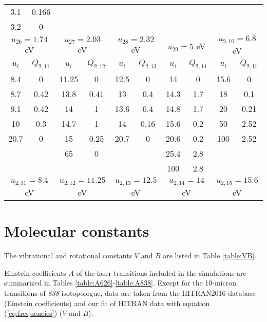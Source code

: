 \documentclass{report}
\begin{document}
\begin{appendices}
\begin{table}
\begin{tabular}{|c|c||c|c||c|c||c|c||c|c|}
3.1  & 0.166  &       &       &       &       &      &      &      &       \\
3.2  & 0      &       &       &       &       &      &      &      &       \\
\multicolumn{2}{|c||}{$u_{26}=1.74$ eV} &
\multicolumn{2}{c||}{$u_{27}=2.03$ eV} &
\multicolumn{2}{c||}{$u_{28}=2.32$ eV} &
\multicolumn{2}{c||}{$u_{29}=5$ eV} &
\multicolumn{2}{c|}{$u_{2,10}=6.8$ eV}\\
\hline
\hline 
$u_i$ & $Q_{2,11}$ & $u_i$ & $Q_{2,12}$ & $u_i$ & $Q_{2,13}$ & $u_i$ & $Q_{2,14}$ & $u_i$ & $Q_{2,15}$ \\                                                                             
\hline
8.4  & 0      & 11.25 & 0     & 12.5  & 0     & 14   & 0    & 15.6 & 0     \\
8.7  & 0.42   & 13.8  & 0.41  & 13    & 0.4   & 14.3 & 1.7  & 18   & 0.1   \\
9.1  & 0.42   & 14    & 1     & 13.6  & 0.4   & 14.8 & 1.7  & 20   & 0.21  \\
10   & 0.3    & 14.7  & 1     & 14    & 0.16  & 15.6 & 0.2  & 50   & 2.52  \\
20.7 & 0      & 15    & 0.25  & 20.7  & 0     & 20.6 & 0.2  & 100  & 2.52  \\
     &        & 65    & 0     &       &       & 25.4 & 2.8  &      &       \\
     &        &       &       &       &       & 100  & 2.8  &      &       \\
\multicolumn{2}{|c||}{$u_{2,11}=8.4$ eV} &
\multicolumn{2}{c||}{$u_{2,12}=11.25$ eV} &
\multicolumn{2}{c||}{$u_{2,13}=12.5$ eV} &
\multicolumn{2}{c||}{$u_{2,14}=14$ eV} &
\multicolumn{2}{c|}{$u_{2,15}=15.6$ eV}\\
\hline 
\end{tabular}
\end{table}


\chapter{Molecular constants}
\label{appendix:molecular_constants}

The vibrational and rotational constants $V$ and $B$ are listed in Table \ref{table:VB}.

Einstein coefficients $A$ of the laser transitions included in the simulations are summarized in Tables \ref{table:A626}-\ref{table:A838}. Except for the 10-micron transitions of \textit{838} isotopologue, data are taken from the HITRAN2016 database \cite{Gordon-2017} (Einstein coefficients) and our fit of HITRAN data with equation (\ref{eq:frequencies}) ($V$ and $B$).


\end{appendices}
\end{document}
